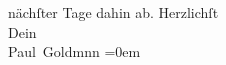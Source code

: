 \begin{ledgroupsized}[t]{13cm}
               nächſter Tage dahin ab.\pend
           \pstart
           Herzlichſt {\\[\baselineskip]}Dein {\\[\baselineskip]}\spacefill\mbox{Paul Goldmnn}\pend
           \leftskip=0em{}
         
         \endnumbering{}\end{ledgroupsized}  \newcommand{\dateiname}{L02842}\newcommand{\titel}{Paul Goldmann an Arthur Schnitzler, 10. 3. [1898]}\newcommand{\editorInnen}{Martin Anton Müller und Laura Untner}
      